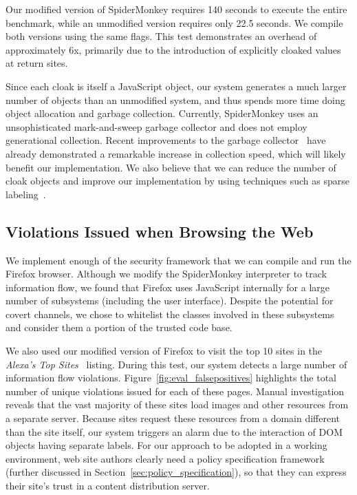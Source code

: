 Our modified version of SpiderMonkey requires 140 seconds to execute the entire benchmark, while an unmodified version requires only 22.5 seconds.
We compile both versions using the same flags.
This test demonstrates an overhead of approximately 6x, primarily due to the introduction of explicitly cloaked values at return sites.

Since each cloak is itself a JavaScript object, our system generates a much larger number of objects than an unmodified system, and thus spends more time doing object allocation and garbage collection.
Currently, SpiderMonkey uses an unsophisticated mark-and-sweep garbage collector and does not employ generational collection.
Recent improvements to the garbage collector~\cite{wagner2011} have already demonstrated a remarkable increase in collection speed, which will likely benefit our implementation.
We also believe that we can reduce the number of cloak objects and improve our implementation by using techniques such as sparse labeling~\cite{1554353,1814220}.


\subsection{Violations Issued when Browsing the Web}
We implement enough of the security framework that we can compile and run the Firefox browser.
Although we modify the SpiderMonkey interpreter to track information flow, we found that Firefox uses JavaScript internally for a large number of subsystems (including the user interface).
Despite the potential for covert channels, we chose to whitelist the classes involved in these subsystems and consider them a portion of the trusted code base.


We also used our modified version of Firefox to visit the top 10 sites in the \textit{Alexa's Top Sites}~\cite{alexa} listing.
During this test, our system detects a large number of information flow violations.
Figure~\ref{fig:eval_falsepositives} highlights the total number of unique violations issued for each of these pages.
Manual investigation reveals that the vast majority of these sites load images and other resources from a separate server.
Because sites request these resources from a domain different than the site itself, our system triggers an alarm due to the interaction of DOM objects having separate labels.
For our approach to be adopted in a working environment, web site authors clearly need a policy specification framework (further discussed in Section~\ref{sec:policy_specification}), so that they can express their site's trust in a content distribution server.


